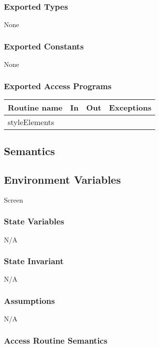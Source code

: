 \documentclass[12pt]{article}
\begin{document}
\subsubsection* {Exported Types}

None

\subsubsection* {Exported Constants}

None

\subsubsection* {Exported Access Programs}

\begin{tabular}{| l | l | l | p{6cm} |}
\hline
\textbf{Routine name} & \textbf{In} & \textbf{Out} & \textbf{Exceptions}\\
\hline
styleElements & ~ & ~ &  \\
\hline
\end{tabular}

\subsection* {Semantics}

\subsection*{Environment Variables}

Screen

\subsubsection* {State Variables}
N/A

\subsubsection* {State Invariant}

N/A

\subsubsection* {Assumptions}

N/A

\subsubsection* {Access Routine Semantics}
\end{document}
